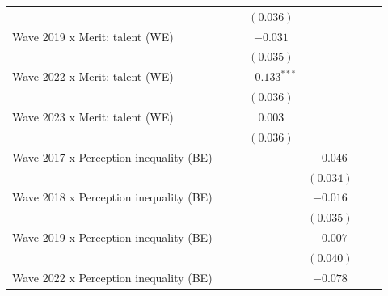 \documentclass[
  12pt,
]{article}
\begin{document}
\begin{table}
{\begin{center}
{\begin{tabular}{l c c c c c c}
                                                   &               &               & $(0.036)$      &              &               &               \\
Wave 2019 x Merit: talent (WE)                     &               &               & $-0.031$       &              &               &               \\
                                                   &               &               & $(0.035)$      &              &               &               \\
Wave 2022 x Merit: talent (WE)                     &               &               & $-0.133^{***}$ &              &               &               \\
                                                   &               &               & $(0.036)$      &              &               &               \\
Wave 2023 x Merit: talent (WE)                     &               &               & $0.003$        &              &               &               \\
                                                   &               &               & $(0.036)$      &              &               &               \\
Wave 2017 x Perception inequality (BE)             &               &               &                & $-0.046$     &               &               \\
                                                   &               &               &                & $(0.034)$    &               &               \\
Wave 2018 x Perception inequality (BE)             &               &               &                & $-0.016$     &               &               \\
                                                   &               &               &                & $(0.035)$    &               &               \\
Wave 2019 x Perception inequality (BE)             &               &               &                & $-0.007$     &               &               \\
                                                   &               &               &                & $(0.040)$    &               &               \\
Wave 2022 x Perception inequality (BE)             &               &               &                & $-0.078$     &               &               \\

\end{tabular}}
\end{center}}
\end{table}
\end{document}
